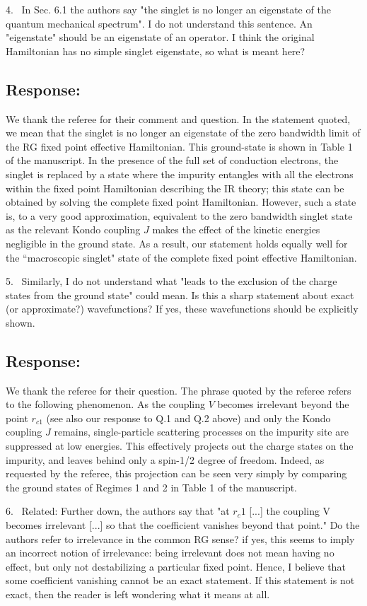 \documentclass{article}
\newcommand{\response}[1]{{\color{blue}\subsection*{Response:}{#1}\vspace*{10pt}}}
\begin{document}
4.~
In Sec. 6.1 the authors say "the singlet is no longer an eigenstate of the quantum mechanical spectrum". I do not understand this sentence. An "eigenstate" should be an eigenstate of an operator. I think the original Hamiltonian has no simple singlet eigenstate, so what is meant here? 

\response{
We thank the referee for their comment and question. In the statement quoted, we mean that the singlet is no longer an eigenstate of the zero bandwidth limit of the RG fixed point effective Hamiltonian. This ground-state is shown in Table 1 of the manuscript. In the presence of the full set of conduction electrons, the singlet is replaced by a state where the impurity entangles with all the electrons within the fixed point Hamiltonian describing the IR theory; this state can be obtained by solving the complete fixed point Hamiltonian. However, such a state is, to a very good approximation, equivalent to the zero bandwidth singlet state as the relevant Kondo coupling \(J\) makes the effect of the kinetic energies negligible in the ground state. As a result, our statement holds equally well for the ``macroscopic singlet" state of the complete fixed point effective Hamiltonian.
}

5.~
	Similarly, I do not understand what "leads to the exclusion of the charge states from the ground state" could mean. Is this a sharp statement about exact (or approximate?) wavefunctions? If yes, these wavefunctions should be explicitly shown.

\response{
	We thank the referee for their question. The phrase quoted by the referee refers to the following phenomenon. As the coupling \(V\) becomes irrelevant beyond the point \(r_{c1}\) (see also our response to Q.1 and Q.2 above) and only the Kondo coupling \(J\) remains, single-particle scattering processes on the impurity site are suppressed at low energies. This effectively projects out the charge states on the impurity, and leaves behind only a spin-1/2 degree of freedom. Indeed, as requested by the referee, this projection can be seen very simply by comparing the ground states of Regimes 1 and 2 in Table 1 of the manuscript.
}

6.~
Related: Further down, the authors say that "at $r_c1$ [...] the coupling V becomes irrelevant [...] so that the coefficient vanishes beyond that point." Do the authors refer to irrelevance in the common RG sense? if yes, this seems to imply an incorrect notion of irrelevance: being irrelevant does not mean having no effect, but only not destabilizing a particular fixed point. Hence, I believe that some coefficient vanishing cannot be an exact statement. If this statement is not exact, then the reader is left wondering what it means at all.
\end{document}
